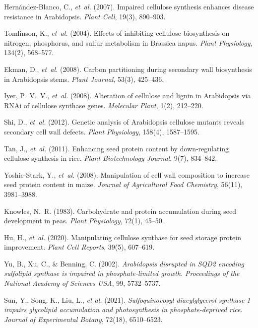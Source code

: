 \documentclass[10pt,letterpaper]{article}
\begin{document}
\begin{thebibliography}{10}
Hernández‐Blanco, C., \emph{et~al.} (2007).  
Impaired cellulose synthesis enhances disease resistance in Arabidopsis.  
\emph{Plant Cell}, 19(3), 890–903.

Tomlinson, K., \emph{et~al.} (2004).  
Effects of inhibiting cellulose biosynthesis on nitrogen, phosphorus, and sulfur metabolism in Brassica napus.  
\emph{Plant Physiology}, 134(2), 568–577.

Ekman, D., \emph{et~al.} (2008).  
Carbon partitioning during secondary wall biosynthesis in Arabidopsis stems.  
\emph{Plant Journal}, 53(3), 425–436.

Iyer, P.~V.~V., \emph{et~al.} (2008).  
Alteration of cellulose and lignin in Arabidopsis via RNAi of cellulose synthase genes.  
\emph{Molecular Plant}, 1(2), 212–220.

Shi, D., \emph{et~al.} (2012).  
Genetic analysis of Arabidopsis cellulose mutants reveals secondary cell wall defects.  
\emph{Plant Physiology}, 158(4), 1587–1595.

Tan, J., \emph{et~al.} (2011).  
Enhancing seed protein content by down‐regulating cellulose synthesis in rice.  
\emph{Plant Biotechnology Journal}, 9(7), 834–842.

Yoshie‐Stark, Y., \emph{et~al.} (2008).  
Manipulation of cell wall composition to increase seed protein content in maize.  
\emph{Journal of Agricultural Food Chemistry}, 56(11), 3981–3988.

Knowles, N.~R. (1983).  
Carbohydrate and protein accumulation during seed development in peas.  
\emph{Plant Physiology}, 72(1), 45–50.

Hu, H., \emph{et~al.} (2020).  
Manipulating cellulose synthase for seed storage protein improvement.  
\emph{Plant Cell Reports}, 39(5), 607–619.


Yu, B., Xu, C., \& Benning, C. (2002).  
\emph{Arabidopsis disrupted in SQD2 encoding sulfolipid synthase is impaired in phosphate-limited growth.}  
\textit{Proceedings of the National Academy of Sciences USA}, 99, 5732–5737.

Sun, Y., Song, K., Liu, L., \emph{et al.} (2021).  
\emph{Sulfoquinovosyl diacylglycerol synthase 1 impairs glycolipid accumulation and photosynthesis in phosphate-deprived rice.}  
\textit{Journal of Experimental Botany}, 72(18), 6510–6523.


\end{thebibliography}
\end{document}
